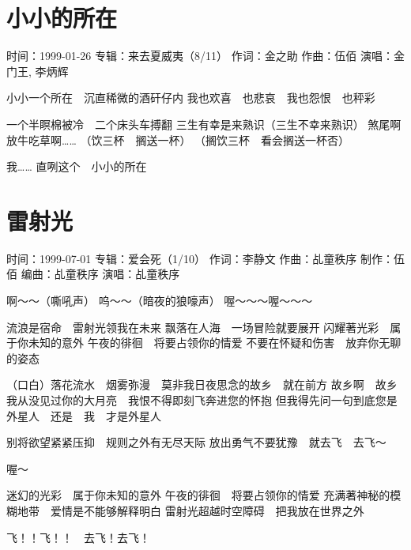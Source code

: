 \documentclass[UTF8,a4paper,oneside,twocolumn,12pt]{ctexbook}
\newcommand{\infopair}[2]{\textbullet #1：#2}
\newcommand{\zc}[1][伍佰]{\infopair{作词}{#1}}
\newcommand{\zq}[1][伍佰]{\infopair{作曲}{#1}}
\newcommand{\bq}[1][伍佰]{\infopair{编曲}{#1}}
\newcommand{\zj}[1]{\infopair{专辑}{#1}}
\newcommand{\zz}[1]{\infopair{制作}{#1}}
\newcommand{\sj}[1]{\infopair{时间}{#1}}
\newenvironment{info}{\begin{flushleft}\kaishu
	}
	{\end{flushleft}\normalsize\yahei\par}
\newenvironment{lyric}{
	}
{}
\begin{document}
\section{小小的所在}
\begin{info}
	\sj{1999-01-26}
	\zj{来去夏威夷（8/11）}
	\zc[金之助]
	\zq[伍佰]
	\infopair{演唱}{金门王, 李炳辉}
\end{info}
\begin{lyric}
	小小一个所在　沉直稀微的酒矸仔内
	我也欢喜　也悲哀　我也怨恨　也秤彩

	一个半瞑棉被冷　二个床头车搏翻
	三生有幸是来熟识（三生不幸来熟识）
	煞尾啊放牛吃草啊……
	（饮三杯　搁送一杯）
	（搁饮三杯　看会搁送一杯否）

	我…… 直咧这个　小小的所在
\end{lyric}

\section{雷射光}
\begin{info}
	\sj{1999-07-01}
	\zj{爱会死（1/10）}
	\zc[李静文]
	\zq[乩童秩序]
	\zz{伍佰}
	\bq[乩童秩序]
	\infopair{演唱}{乩童秩序}
\end{info}
\begin{lyric}
	啊～～（嘶吼声）
	呜～～（暗夜的狼嚎声）
	喔～～～喔～～～

	流浪是宿命　雷射光领我在未来
	飘落在人海　一场冒险就要展开
	闪耀著光彩　属于你未知的意外
	午夜的徘徊　将要占领你的情爱
	不要在怀疑和伤害　放弃你无聊的姿态

	（口白）落花流水　烟雾弥漫　莫非我日夜思念的故乡　就在前方
	故乡啊　故乡　我从没见过你的大月亮　我恨不得即刻飞奔进您的怀抱
	但我得先问一句到底您是外星人　还是　我　才是外星人

	别将欲望紧紧压抑　规则之外有无尽天际
	放出勇气不要犹豫　就去飞　去飞～

	喔～

	迷幻的光彩　属于你未知的意外
	午夜的徘徊　将要占领你的情爱
	充满著神秘的模糊地带　爱情是不能够解释明白
	雷射光超越时空障碍　把我放在世界之外

	飞！！飞！！　去飞！去飞！
\end{lyric}
\end{document}
